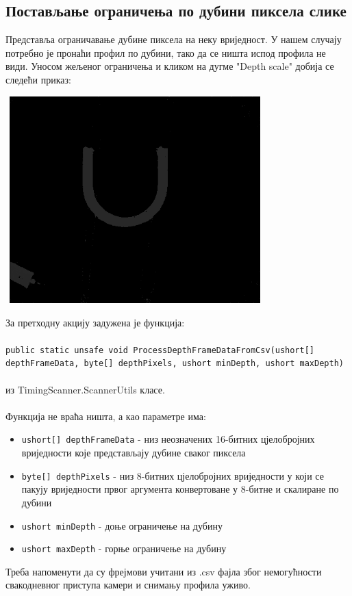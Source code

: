\documentclass[12pt]{article}
\begin{document}
\subsection{Постављање ограничења по дубини пиксела слике}
Представља ограничавање дубине пиксела на неку вриједност. У нашем случају потребно је пронаћи профил по дубини, тако да се ништа испод профила не види. Уносом жељеног ограничења и кликом на дугме "Depth scale" добија се следећи приказ:
\vspace{0.5cm}
\begin{center}
    \centering 
    \includegraphics[height=8cm, width=10cm]{images/2_depth.png}
\end{center}
\vspace{0.5cm}
За претходну акцију задужена је функција:\\\\
\texttt{public static unsafe void ProcessDepthFrameDataFromCsv(ushort[] depthFrameData, byte[] depthPixels, ushort minDepth, ushort maxDepth)}\\\\
из TimingScanner.ScannerUtils класе.\\\\
Функција не враћа ништа, а као параметре има:
\begin{itemize}
    \item \texttt{ushort[] depthFrameData} - низ неозначених 16-битних цјелобројних вриједности које представљају дубине сваког пиксела
    \item \texttt{byte[] depthPixels} - низ 8-битних цјелобројних вриједности у који се пакују вриједности првог аргумента конвертоване у 8-битне и скалиране по дубини
    \item \texttt{ushort minDepth} - доње ограничење на дубину
    \item \texttt{ushort maxDepth} - горње ограничење на дубину
\end{itemize}
Треба напоменути да су фрејмови учитани из .csv фајла због немогућности свакодневног приступа камери и снимању профила уживо.
\end{document}
